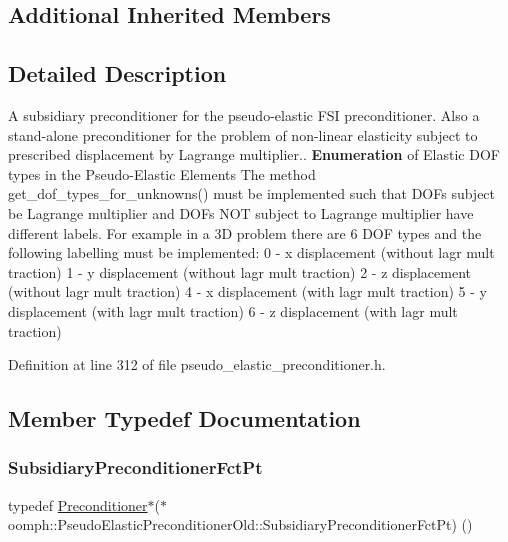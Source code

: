 \subsection*{Additional Inherited Members}


\subsection{Detailed Description}
A subsidiary preconditioner for the pseudo-\/elastic F\+SI preconditioner. Also a stand-\/alone preconditioner for the problem of non-\/linear elasticity subject to prescribed displacement by Lagrange multiplier.. {\bfseries Enumeration} of Elastic D\+OF types in the Pseudo-\/\+Elastic Elements The method get\+\_\+dof\+\_\+types\+\_\+for\+\_\+unknowns() must be implemented such that D\+O\+Fs subject be Lagrange multiplier and D\+O\+Fs N\+OT subject to Lagrange multiplier have different labels. For example in a 3D problem there are 6 D\+OF types and the following labelling must be implemented\+: 0 -\/ x displacement (without lagr mult traction) 1 -\/ y displacement (without lagr mult traction) 2 -\/ z displacement (without lagr mult traction) 4 -\/ x displacement (with lagr mult traction) 5 -\/ y displacement (with lagr mult traction) 6 -\/ z displacement (with lagr mult traction) 

Definition at line 312 of file pseudo\+\_\+elastic\+\_\+preconditioner.\+h.



\subsection{Member Typedef Documentation}
\mbox{\label{classoomph_1_1PseudoElasticPreconditionerOld_a8ee80a4a55139190a6e2a16fa175e75f}} 
\subsubsection{\texorpdfstring{Subsidiary\+Preconditioner\+Fct\+Pt}{SubsidiaryPreconditionerFctPt}}
{\footnotesize\ttfamily typedef \hyperlink{classoomph_1_1Preconditioner}{Preconditioner}$\ast$($\ast$ oomph\+::\+Pseudo\+Elastic\+Preconditioner\+Old\+::\+Subsidiary\+Preconditioner\+Fct\+Pt) ()}



